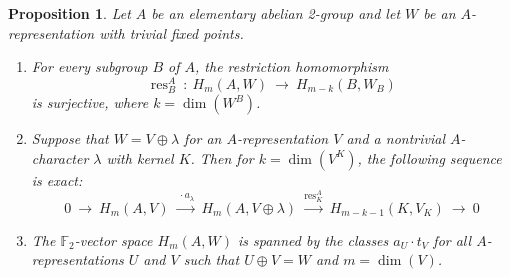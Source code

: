 \documentclass{amsart}[12pt]
\DeclareMathOperator{\res}{res}
\newcommand{\mF}{{\mathbb F}}
\newcommand{\xra}{\xrightarrow}
\renewcommand{\to}{\longrightarrow}
\numberwithin{equation}{section}
\newtheorem{prop}[equation]{Proposition}
\theoremstyle{definition}
\begin{document}
\begin{prop}\label{prop:fundamental}
  Let $A$ be an elementary abelian 2-group and let $W$ be an $A$-representation
  with trivial fixed points.
  \begin{enumerate}[\em (i)]
\item For every subgroup $B$ of $A$, the restriction homomorphism
  \[ \res^A_B\ : \ H_m(A,W)\ \to \ H_{m-k}(B,W_B) \]
  is surjective, where $k=\dim(W^B)$.
\item 
  Suppose that $W=V\oplus\lambda$ for an $A$-representation $V$ and
  a nontrivial $A$-character $\lambda$ with kernel $K$.
  Then for $k=\dim(V^K)$, the following sequence is exact: 
  \[ 0 \ \to \ H_m(A,V)\ \xra{\ \cdot a_\lambda} \ H_m(A,V\oplus\lambda)\ \xra{\res^A_K} \
    H_{m-k-1}(K,V_K)\ \to\ 0  \]

  \item The  $\mF_2$-vector space $H_m(A,W)$ is spanned by the classes $a_U\cdot t_V$
  for all $A$-representations $U$ and $V$ such that $U\oplus V= W$
  and $m=\dim(V)$.
\end{enumerate}
\end{prop}
\end{document}
